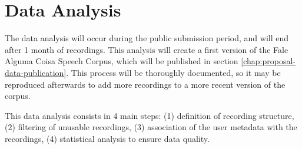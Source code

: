 \chapter{Data Analysis}
\label{chap:proposal-data-analysis}

The data analysis will occur during the public submission period, and will end after 1 month of recordings. This analysis will create a first version of the Fale Alguma Coisa Speech Corpus, which will be published in section \ref{chap:proposal-data-publication}. This process will be thoroughly documented, so it may be reproduced afterwards to add more recordings to a more recent version of the corpus.

This data analysis consists in 4 main steps: (1) definition of recording structure, (2) filtering of unusable recordings, (3) association of the user metadata with the recordings, (4) statistical analysis to ensure data quality.
